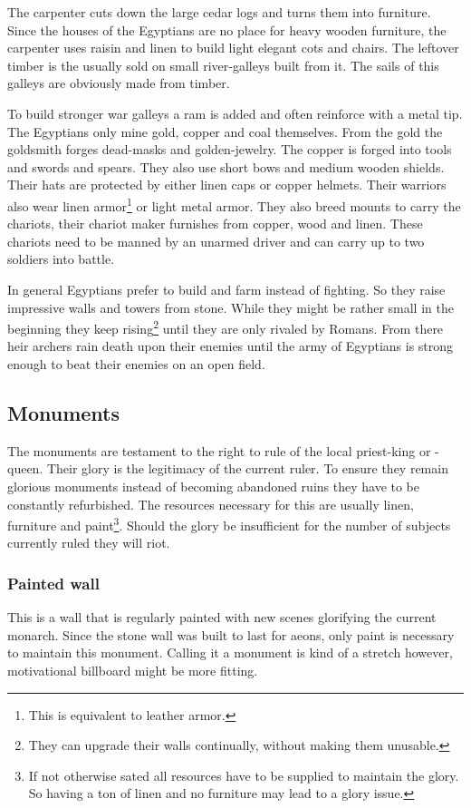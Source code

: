 \documentclass[a4paper]{book}
\begin{document}
	The carpenter cuts down the large cedar logs and turns them into furniture.
	Since the houses of the \gls{Egyptians} are no place for heavy wooden furniture,
	the carpenter uses raisin and linen to build light elegant cots and chairs.
	The leftover timber is the usually sold on small river-galleys built from it.
	The sails of this galleys are obviously made from timber.

	To build stronger war galleys a ram is added and often reinforce with a metal tip.
	The \gls{Egyptians} only mine gold, copper and coal themselves.
	From the gold the goldsmith forges dead-masks and golden-jewelry.
	The copper is forged into tools and swords and spears.
	They also use short bows and medium wooden shields.
	Their hats are protected by either linen caps or copper helmets.
	Their warriors also wear linen armor\footnote{
		This is equivalent to leather armor.
	} or light metal armor.
	They also breed mounts to carry the chariots, their chariot maker
	furnishes from copper, wood and linen.
	These chariots need to be manned by an unarmed driver and can carry up to two soldiers into battle.

	In general \gls{Egyptians} prefer to build and farm instead of fighting.
	So they raise impressive walls and towers from stone.
	While they might be rather small in the beginning they keep rising\footnote{
		They can upgrade their walls continually, without making them unusable.
	}
	until they are only rivaled by \gls{Romans}.
	From there heir archers rain death upon their enemies
	until the army of \gls{Egyptians} is strong enough to beat their enemies on 
	an open field.

	\subsection{Monuments}
		The monuments are testament to the right to rule of the local priest-king or -queen.
		Their glory is the legitimacy of the current ruler.
		To ensure they remain glorious monuments instead of becoming abandoned ruins
		they have to be constantly refurbished.
		The resources necessary for this are usually linen, furniture and paint\footnote{
			If not otherwise sated all resources have to be supplied to maintain the glory.
			So having a ton of linen and no furniture may lead to a glory issue.
		}.
		Should the glory be insufficient for the number of subjects currently ruled
		they will riot.

		\subsubsection{Painted wall}
			This is a wall that is regularly painted with new scenes glorifying the current monarch.
			Since the stone wall was built to last for aeons,
			only paint is necessary to maintain this monument.
			Calling it a monument is kind of a stretch however,
			motivational billboard might be more fitting.
\end{document}

